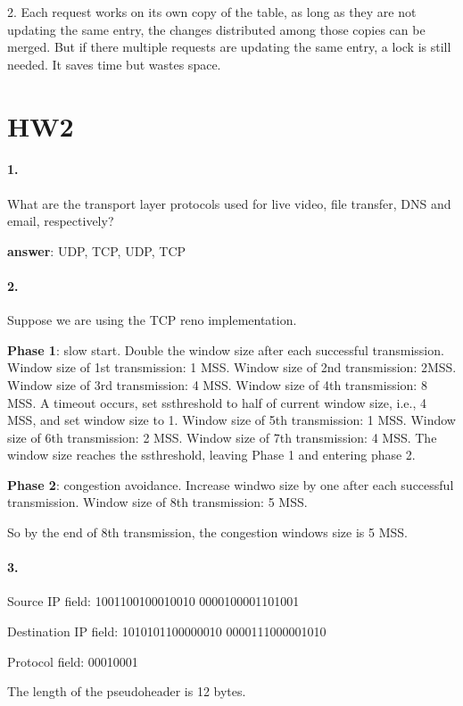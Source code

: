 \documentclass{article}
\begin{document}
2. Each request works on its own copy of the table, as long as they are not updating the same entry, the changes distributed among those copies can be merged. But if there multiple requests are updating the same entry, a lock is still needed. It saves time but wastes space.

\section{HW2}

\paragraph{1.} What are the transport layer protocols used for live video, file transfer, DNS and email, respectively?

\noindent \textbf{answer}: UDP, TCP, UDP, TCP

\paragraph{2.} Suppose we are using the TCP reno implementation.

\textbf{Phase 1}: slow start. Double the window size after each successful transmission. Window size of 1st transmission: 1 MSS. Window size of 2nd transmission: 2MSS. Window size of 3rd transmission: 4 MSS. Window size of 4th transmission: 8 MSS. A timeout occurs, set ssthreshold to half of current window size, i.e., 4 MSS, and set window size to 1. Window size of 5th transmission: 1 MSS. Window size of 6th transmission: 2 MSS. Window size of 7th transmission: 4 MSS. The window size reaches the ssthreshold, leaving Phase 1 and entering phase 2.

\textbf{Phase 2}: congestion avoidance. Increase windwo size by one after each successful transmission. Window size of 8th transmission: 5 MSS.

So by the end of 8th transmission, the congestion windows size is 5 MSS.

\paragraph{3.}

Source IP field: 1001100100010010 0000100001101001

Destination IP field: 1010101100000010 0000111000001010

Protocol field: 00010001

The length of the pseudoheader is 12 bytes.
\end{document}
